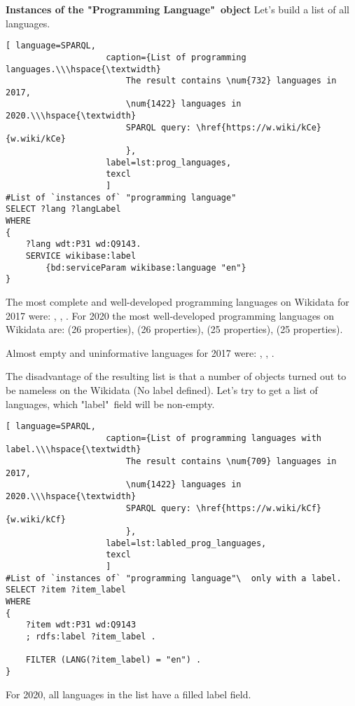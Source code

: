 \textbf{Instances of the "Programming Language"\  object}\newline
Let's build a list of all languages.
\begin{lstlisting}[ language=SPARQL, 
                    caption={List of programming languages.\\\hspace{\textwidth}
                        The result contains \num{732} languages in 2017, 
                        \num{1422} languages in 2020.\\\hspace{\textwidth}
                        SPARQL query: \href{https://w.wiki/kCe}{w.wiki/kCe}
                        },
                    label=lst:prog_languages,
                    texcl 
                    ]
#List of `instances of` "programming language" 
SELECT ?lang ?langLabel
WHERE
{
    ?lang wdt:P31 wd:Q9143.
    SERVICE wikibase:label 
		{bd:serviceParam wikibase:language "en"}
}
\end{lstlisting}%

The most complete and well-developed programming languages on Wikidata for 2017 were: , , . For 2020 the most well-developed programming languages on Wikidata are:  (26 properties),  (26 properties),  (25 properties),  (25 properties).

Almost empty and uninformative languages for 2017 were: , , .

The disadvantage of the resulting list is that a number of objects turned out to be nameless on the Wikidata (No label defined). Let's try to get a list of languages, which "label"\  field will be non-empty.

\begin{lstlisting}[ language=SPARQL, 
                    caption={List of programming languages with label.\\\hspace{\textwidth}
                        The result contains \num{709} languages in 2017, 
                        \num{1422} languages in 2020.\\\hspace{\textwidth}
                        SPARQL query: \href{https://w.wiki/kCf}{w.wiki/kCf}
                        },
                    label=lst:labled_prog_languages,
                    texcl 
                    ]
#List of `instances of` "programming language"\  only with a label.
SELECT ?item ?item_label
WHERE
{
    ?item wdt:P31 wd:Q9143
    ; rdfs:label ?item_label . 

    FILTER (LANG(?item_label) = "en") . 
}
\end{lstlisting}%
For 2020, all languages in the list have a filled label field.


